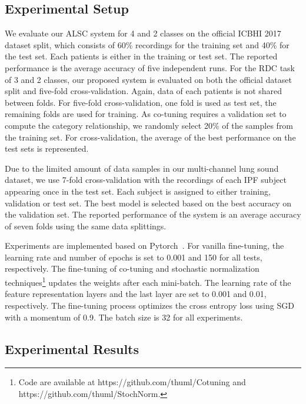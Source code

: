 \documentclass[journal]{IEEEtran}
\begin{document}
\subsection{Experimental Setup}
We evaluate our ALSC system for 4 and 2 classes on the official ICBHI 2017 dataset split, which consists of 60\% recordings for the training set and 40\% for the test set. Each patients is either in the training or test set. The reported performance is the average accuracy of five independent runs.
For the RDC task of 3 and 2 classes, our proposed system is evaluated on both the official dataset split and five-fold cross-validation. Again, data of each patients is not shared between folds. For five-fold cross-validation, one fold is used as test set, the remaining folds are used for training. As co-tuning requires a validation set to compute the category relationship, we randomly select 20\% of the samples from the training set. For cross-validation, the average of the best performance on the test sets is represented. 

Due to the limited amount of data samples in our multi-channel lung sound dataset, we use 7-fold cross-validation with the recordings of each IPF subject appearing once in the test set. Each subject is assigned to either training, validation or test set. The best model is selected based on the best accuracy on the validation set. The reported performance of the system is an average accuracy of seven folds using the same data splittings. 

Experiments are implemented based on Pytorch~\cite{NEURIPS2019_bdbca288}. 
For vanilla fine-tuning, the learning rate and number of epochs is set to 0.001 and 150 for all tests, respectively. The fine-tuning of co-tuning and stochastic normalization techniques\footnote{Code are available at https://github.com/thuml/Cotuning and https://github.com/thuml/StochNorm.} updates the weights after each mini-batch. The learning rate of the feature representation layers and the last layer are set to 0.001 and 0.01, respectively. The fine-tuning process optimizes the cross entropy loss using SGD with a momentum of 0.9. The batch size is 32 for all experiments.

\subsection{Experimental Results}
\end{document}
